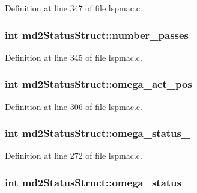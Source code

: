 Definition at line 347 of file lspmac.\-c.

\hypertarget{structmd2StatusStruct_ab3da523bad7b82c1d27780caa24a8b92}{
\subsubsection[{number\-\_\-passes}]{\setlength{\rightskip}{0pt plus 5cm}int md2\-Status\-Struct\-::number\-\_\-passes}}\label{structmd2StatusStruct_ab3da523bad7b82c1d27780caa24a8b92}


Definition at line 345 of file lspmac.\-c.

\hypertarget{structmd2StatusStruct_a6ce303bec89082cae1e9b1fddf6b6c10}{
\subsubsection[{omega\-\_\-act\-\_\-pos}]{\setlength{\rightskip}{0pt plus 5cm}int md2\-Status\-Struct\-::omega\-\_\-act\-\_\-pos}}\label{structmd2StatusStruct_a6ce303bec89082cae1e9b1fddf6b6c10}


Definition at line 306 of file lspmac.\-c.

\hypertarget{structmd2StatusStruct_af6cf3cd65b9ef205685a0d970f168907}{
\subsubsection[{omega\-\_\-status\-\_\-1}]{\setlength{\rightskip}{0pt plus 5cm}int md2\-Status\-Struct\-::omega\-\_\-status\-\_}}\label{structmd2StatusStruct_af6cf3cd65b9ef205685a0d970f168907}


Definition at line 272 of file lspmac.\-c.

\hypertarget{structmd2StatusStruct_a8577c9df7b663b548b2759ac3db721cd}{
\subsubsection[{omega\-\_\-status\-\_\-2}]{\setlength{\rightskip}{0pt plus 5cm}int md2\-Status\-Struct\-::omega\-\_\-status\-\_}}\label{structmd2StatusStruct_a8577c9df7b663b548b2759ac3db721cd}


